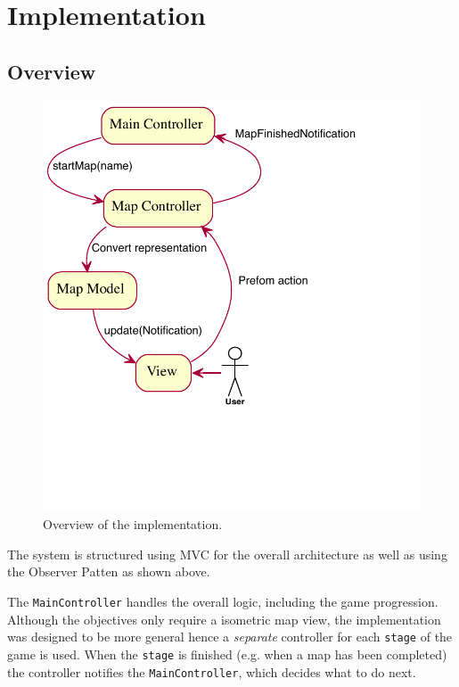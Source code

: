 
\section{Implementation}

\subsection{Overview}

\begin{figure}[htbp]
	\centering
		\includegraphics{figures/engine_exported.pdf}
	\caption{Overview of the implementation.}
	\label{fig:overview_engine}
\end{figure}

The system is structured using MVC for the overall architecture as well as  using the Observer Patten as shown above.

The \texttt{MainController} handles the overall logic, including the game progression. 
Although the objectives only require a isometric  map view, the implementation was designed to be more general  hence a \emph{separate} controller for each \texttt{stage} of the game is used. When the \texttt{stage} is finished  (e.g. when a map has been completed) the controller notifies the \texttt{MainController}, which decides what to do next.   

